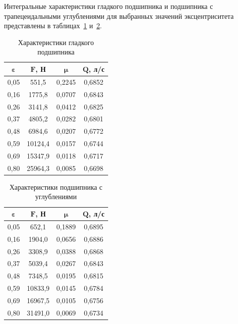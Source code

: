 Интегральные характеристики гладкого подшипника и подшипника с трапецеидальными углублениями для выбранных значений эксцентриситета представлены в таблицах~\ref{tab:smooth_results} и~\ref{tab:textured_results}.

\begin{table}[H]
\small
\centering
\caption{Характеристики гладкого подшипника}
\label{tab:smooth_results}
\begin{tabular}{|c|c|c|c|}
\hline
$\boldsymbol{\varepsilon}$ & $\boldsymbol{F}$\textbf{, Н} & $\boldsymbol{\mu}$ & $\boldsymbol{Q}$\textbf{, л/с} \\
\hline
0{,}05 & 551{,}5 & 0{,}2245 & 0{,}6852 \\
\hline
0{,}16 & 1775{,}8 & 0{,}0707 & 0{,}6843 \\
\hline
0{,}26 & 3141{,}8 & 0{,}0412 & 0{,}6825 \\
\hline
0{,}37 & 4805{,}2 & 0{,}0282 & 0{,}6801 \\
\hline
0{,}48 & 6984{,}6 & 0{,}0207 & 0{,}6772 \\
\hline
0{,}59 & 10124{,}4 & 0{,}0157 & 0{,}6744 \\
\hline
0{,}69 & 15347{,}9 & 0{,}0118 & 0{,}6717 \\
\hline
0{,}80 & 25964{,}3 & 0{,}0085 & 0{,}6698 \\
\hline
\end{tabular}
\end{table}

\begin{table}[H]
\small
\centering
\caption{Характеристики подшипника с \varDimpleTypeGenitive{} углублениями}
\label{tab:textured_results}
\begin{tabular}{|c|c|c|c|}
\hline
$\boldsymbol{\varepsilon}$ & $\boldsymbol{F}$\textbf{, Н} & $\boldsymbol{\mu}$ & $\boldsymbol{Q}$\textbf{, л/с} \\
\hline
0{,}05 & 652{,}1 & 0{,}1889 & 0{,}6895 \\
\hline
0{,}16 & 1904{,}0 & 0{,}0656 & 0{,}6886 \\
\hline
0{,}26 & 3308{,}9 & 0{,}0388 & 0{,}6868 \\
\hline
0{,}37 & 5039{,}4 & 0{,}0267 & 0{,}6843 \\
\hline
0{,}48 & 7348{,}5 & 0{,}0195 & 0{,}6815 \\
\hline
0{,}59 & 10833{,}9 & 0{,}0145 & 0{,}6784 \\
\hline
0{,}69 & 16967{,}5 & 0{,}0105 & 0{,}6756 \\
\hline
0{,}80 & 31491{,}0 & 0{,}0069 & 0{,}6734 \\
\hline
\end{tabular}
\end{table}


